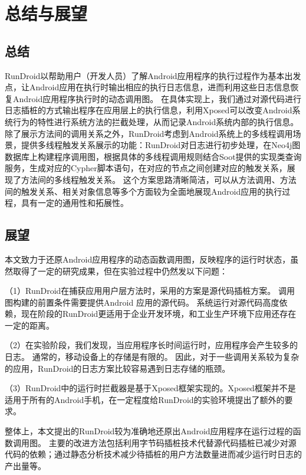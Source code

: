 \chapter{总结与展望}
\label{chp:future}
\section{总结}



RunDroid以帮助用户（开发人员）了解Android应用程序的执行过程作为基本出发点，让Android应用在执行时输出相应的执行日志信息，进而利用这些日志信息恢复Android应用程序执行时的动态调用图。
在具体实现上，我们通过对源代码进行日志插桩的方式输出程序在应用层上的执行信息，利用Xposed可以改变Android系统行为的特性进行系统方法的拦截处理，从而记录Android系统内部的执行信息。
除了展示方法间的调用关系之外，RunDroid考虑到Android系统上的多线程调用场景，提供多线程触发关系展示的功能：RunDroid对日志进行初步处理，在Neo4j图数据库上构建程序调用图，根据具体的多线程调用规则结合Soot提供的实现类查询服务，生成对应的Cypher脚本语句，在对应的节点之间创建对应的触发关系，展现了方法间的多线程触发关系。
这个方案思路清晰简洁，可以从方法调用、方法间的触发关系、相关对象信息等多个方面较为全面地展现Android应用的执行过程，具有一定的通用性和拓展性。



\section{展望}

本文致力于还原Android应用程序的动态函数调用图，反映程序的运行时状态，虽然取得了一定的研究成果，但在实验过程中仍然发以下问题：

（1）RunDroid在捕获应用用户层方法时，采用的方案是源代码插桩方案。
调用图构建的前置条件需要提供Android 应用的源代码。
系统运行对源代码高度依赖，现在阶段的RunDroid更适用于企业开发环境，和工业生产环境下应用还存在一定的距离。

（2）在实验阶段，我们发现，当应用程序长时间运行时，应用程序会产生较多的日志。
通常的，移动设备上的存储是有限的。
因此，对于一些调用关系较为复杂的应用，RunDroid的日志方案比较容易遇到日志存储的瓶颈。

（3）RunDroid中的运行时拦截器是基于Xposed框架实现的。Xposed框架并不是适用于所有的Android手机，在一定程度给RunDroid的实验环境提出了额外的要求。

整体上，本文提出的RunDroid较为准确地还原出Android应用程序在运行过程的函数调用图。
主要的改进方法包括利用字节码插桩技术代替源代码插桩已减少对源代码的依赖；通过静态分析技术减少待插桩的用户方法数量进而减少运行时日志的产出量等。
